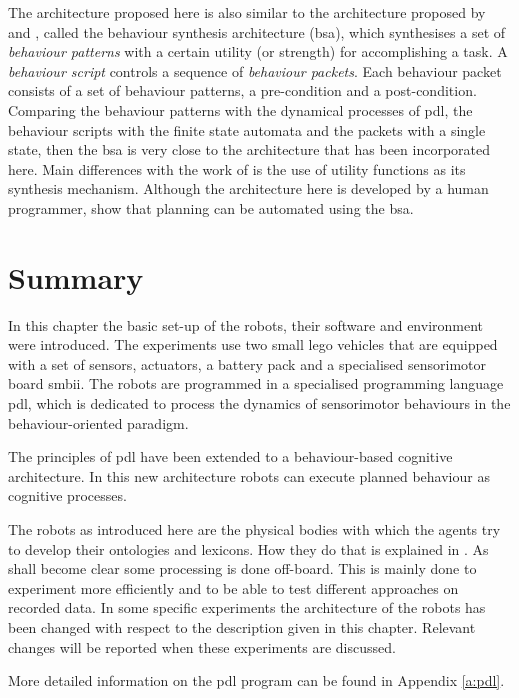 
The architecture proposed here is also similar to the architecture proposed by \citet{barnes:1996} and \citet{barnesetal:1997}, called the behaviour synthesis architecture ({\sc bsa}), which synthesises a set of {\em behaviour patterns} with a certain utility (or strength) for accomplishing a task. A {\em behaviour script} controls a sequence of {\em behaviour packets}. Each behaviour packet consists of a set of behaviour patterns, a pre-condition and a post-condition. Comparing the behaviour patterns with the dynamical processes of {\sc pdl}, the behaviour scripts with the finite state automata and the packets with a single state, then the {\sc bsa} is very close to the architecture that has been incorporated here. Main differences with the work of \citet{barnes:1996} is the use of utility functions as its synthesis mechanism. Although the architecture here is developed by a human programmer, \citet{barnesetal:1997} show that planning can be automated using the {\sc bsa}.


\section{Summary}

In this chapter the basic set-up of the robots, their software and environment were introduced. The experiments use two small {\sc lego} vehicles that are equipped with a set of sensors, actuators, a battery pack and a specialised sensorimotor board {\sc smbii}. The robots are programmed in a specialised programming language {\sc pdl}, which is dedicated to process the dynamics of sensorimotor behaviours in the behaviour-oriented paradigm.

The principles of {\sc pdl} have been extended to a behaviour-based cognitive architecture. In this new architecture robots can execute planned behaviour as cognitive processes.

The robots as introduced here are the physical bodies with which the agents try to develop their ontologies and lexicons. How they do that is explained in . As shall become clear some processing is done off-board. This is mainly done to experiment more efficiently and to be able to test different approaches on recorded data.  In some specific experiments the architecture of the robots has been changed with respect to the description given in this chapter. Relevant changes will be reported when these experiments are discussed.

 More detailed information on the {\sc pdl} program can be found in Appendix \ref{a:pdl}.







